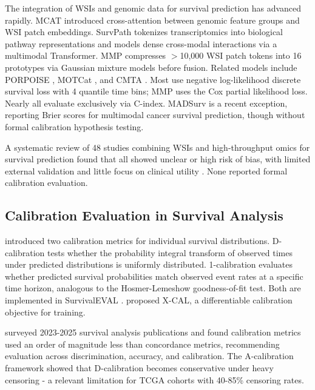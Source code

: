 \documentclass[pmlr]{jmlr}
\begin{document}
The integration of WSIs and genomic data for survival prediction has advanced rapidly. MCAT \citep{chen2021multimodal} introduced cross-attention between genomic feature groups and WSI patch embeddings. SurvPath \citep{jaume2024modeling} tokenizes transcriptomics into biological pathway representations and models dense cross-modal interactions via a multimodal Transformer. MMP \citep{song2024multimodal} compresses $>$10,000 WSI patch tokens into 16 prototypes via Gaussian mixture models before fusion. Related models include PORPOISE \citep{chen2022pan}, MOTCat \citep{xu2023multimodal}, and CMTA \citep{zhou2023cmta}. Most use negative log-likelihood discrete survival loss with 4 quantile time bins; MMP uses the Cox partial likelihood loss. Nearly all evaluate exclusively via C-index. MADSurv \citep{zhang2025madsurv} is a recent exception, reporting Brier scores for multimodal cancer survival prediction, though without formal calibration hypothesis testing.

A systematic review of 48 studies combining WSIs and high-throughput omics for survival prediction found that all showed unclear or high risk of bias, with limited external validation and little focus on clinical utility \citep{jennings2025systematic}. None reported formal calibration evaluation.

\subsection{Calibration Evaluation in Survival Analysis}

\citet{haider2020effective} introduced two calibration metrics for individual survival distributions. D-calibration tests whether the probability integral transform of observed times under predicted distributions is uniformly distributed. 1-calibration evaluates whether predicted survival probabilities match observed event rates at a specific time horizon, analogous to the Hosmer-Lemeshow goodness-of-fit test. Both are implemented in SurvivalEVAL \citep{qi2023survivaleval}. \citet{goldstein2020xcal} proposed X-CAL, a differentiable calibration objective for training.

\citet{lillelund2025stop} surveyed 2023-2025 survival analysis publications and found calibration metrics used an order of magnitude less than concordance metrics, recommending evaluation across discrimination, accuracy, and calibration. The A-calibration framework \citep{simonsen2025acalibration} showed that D-calibration becomes conservative under heavy censoring - a relevant limitation for TCGA cohorts with 40-85\% censoring rates.
\end{document}
